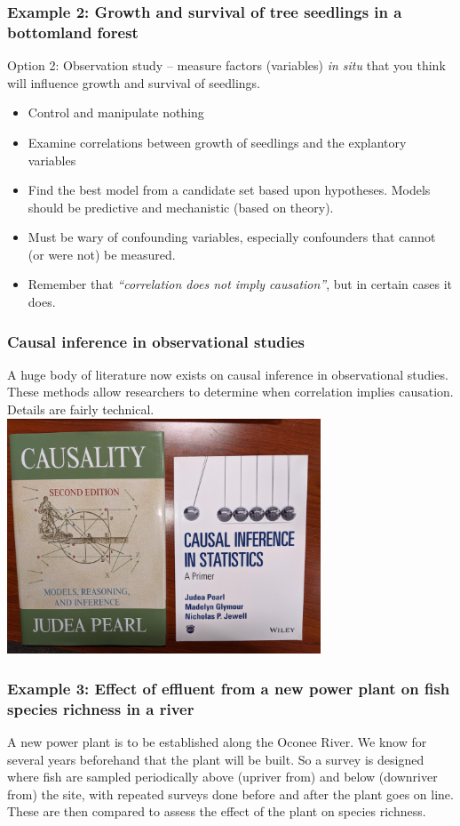 \documentclass[color=usenames,dvipsnames]{beamer}\usepackage[]{graphicx}\usepackage[]{color}
\begin{document}
\begin{frame}
  \frametitle{Example 2: Growth and survival of
    tree seedlings in a bottomland forest}
  Option 2: Observation study -- measure factors (variables) {\it in
    situ} that you think will influence growth and survival of seedlings. 
  \vspace{6pt}
  \begin{itemize}
    \item Control and manipulate nothing
    \item Examine correlations between growth of seedlings and
      the explantory variables
    \item Find the best model from a candidate set based upon
      hypotheses. Models should be predictive and
      mechanistic (based on theory).
    \item Must be wary of confounding variables, especially
      confounders that cannot (or were not) be measured.
    \item Remember that {\it ``correlation does not imply
        causation''}, but in certain cases it does. 
  \end{itemize}
\end{frame}



\begin{frame}
  \frametitle{Causal inference in observational studies}
  \small
  A huge body of literature now exists on causal inference in
  observational studies. These methods allow researchers to determine
  when correlation implies causation. Details are fairly technical. \\
  \vfill
  \centering
  \includegraphics[width=0.7\textwidth]{pearl} \\
\end{frame}



\begin{frame}
  \frametitle{Example 3: Effect of effluent from a new power plant on
    fish species richness in a river}
  A new power plant is to be established along the Oconee River.  We
  know for several years beforehand that the plant will be built.  So
  a survey is designed where fish are sampled periodically above
  (upriver from) and below (downriver from) the site, with repeated
  surveys done before and after the plant goes on line.  These are
  then compared to assess the effect of the plant on species richness.   
\end{frame}
\end{document}

